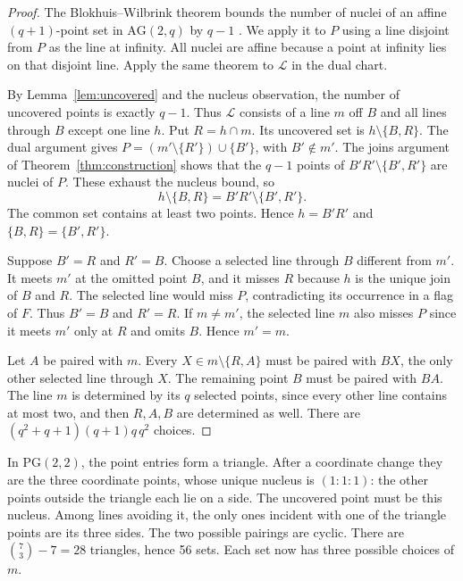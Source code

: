 \documentclass[11pt,a4paper]{amsart}
\newcommand{\PG}{\mathrm{PG}}
\newcommand{\AG}{\mathrm{AG}}
\begin{document}
\begin{proof}
The Blokhuis--Wilbrink theorem bounds the number of nuclei of an affine \((q+1)\)-point set in \(\AG(2,q)\) by \(q-1\) \cite{BlokhuisWilbrink,BlokhuisMazzocca}. We apply it to \(P\) using a line disjoint from \(P\) as the line at infinity. All nuclei are affine because a point at infinity lies on that disjoint line. Apply the same theorem to \(\mathcal L\) in the dual chart.

By Lemma~\ref{lem:uncovered} and the nucleus observation, the number of uncovered points is exactly \(q-1\). Thus \(\mathcal L\) consists of a line \(m\) off \(B\) and all lines through \(B\) except one line \(h\). Put \(R=h\cap m\). Its uncovered set is \(h\setminus\{B,R\}\). The dual argument gives \(P=(m'\setminus\{R'\})\cup\{B'\}\), with \(B'\notin m'\). The joins argument of Theorem~\ref{thm:construction} shows that the \(q-1\) points of \(B'R'\setminus\{B',R'\}\) are nuclei of \(P\). These exhaust the nucleus bound, so
\[
h\setminus\{B,R\}=B'R'\setminus\{B',R'\}.
\]
The common set contains at least two points. Hence \(h=B'R'\) and \(\{B,R\}=\{B',R'\}\).

Suppose \(B'=R\) and \(R'=B\). Choose a selected line through \(B\) different from \(m'\). It meets \(m'\) at the omitted point \(B\), and it misses \(R\) because \(h\) is the unique join of \(B\) and \(R\). The selected line would miss \(P\), contradicting its occurrence in a flag of \(F\). Thus \(B'=B\) and \(R'=R\). If \(m\ne m'\), the selected line \(m\) also misses \(P\) since it meets \(m'\) only at \(R\) and omits \(B\). Hence \(m'=m\).

Let \(A\) be paired with \(m\). Every \(X\in m\setminus\{R,A\}\) must be paired with \(BX\), the only other selected line through \(X\). The remaining point \(B\) must be paired with \(BA\). The line \(m\) is determined by its \(q\) selected points, since every other line contains at most two, and then \(R,A,B\) are determined as well. There are \((q^2+q+1)(q+1)q\,q^2\) choices.
\end{proof}

In \(\PG(2,2)\), the point entries form a triangle. After a coordinate change they are the three coordinate points, whose unique nucleus is \((1:1:1)\): the other points outside the triangle each lie on a side. The uncovered point must be this nucleus. Among lines avoiding it, the only ones incident with one of the triangle points are its three sides. The two possible pairings are cyclic. There are \(\binom73-7=28\) triangles, hence 56 sets. Each set now has three possible choices of \(m\).
\end{document}
